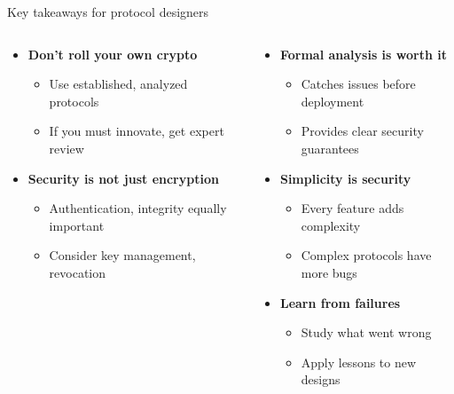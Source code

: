 \documentclass[aspectratio=169, lualatex, handout]{beamer}
\begin{document}
\begin{frame}{Key takeaways for protocol designers}
	\begin{columns}[c]
		\begin{column}{0.5\textwidth}
			\begin{itemize}
				\item \textbf{Don't roll your own crypto}
				      \begin{itemize}
					      \item Use established, analyzed protocols
					      \item If you must innovate, get expert review
				      \end{itemize}
				\item \textbf{Security is not just encryption}
				      \begin{itemize}
					      \item Authentication, integrity equally important
					      \item Consider key management, revocation
				      \end{itemize}
			\end{itemize}
		\end{column}
		\begin{column}{0.5\textwidth}
			\begin{itemize}
				\item \textbf{Formal analysis is worth it}
				      \begin{itemize}
					      \item Catches issues before deployment
					      \item Provides clear security guarantees
				      \end{itemize}
				\item \textbf{Simplicity is security}
				      \begin{itemize}
					      \item Every feature adds complexity
					      \item Complex protocols have more bugs
				      \end{itemize}
				\item \textbf{Learn from failures}
				      \begin{itemize}
					      \item Study what went wrong
					      \item Apply lessons to new designs
				      \end{itemize}
			\end{itemize}
		\end{column}
	\end{columns}
\end{frame}
\end{document}
